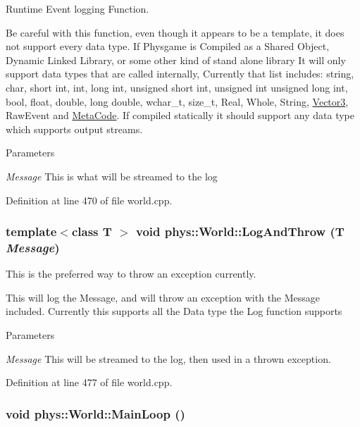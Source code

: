 Runtime Event logging Function. 

Be careful with this function, even though it appears to be a template, it does not support every data type. If Physgame is Compiled as a Shared Object, Dynamic Linked Library, or some other kind of stand alone library It will only support data types that are called internally, Currently that list includes: string, char, short int, int, long int, unsigned short int, unsigned int unsigned long int, bool, float, double, long double, wchar\_\-t, size\_\-t, Real, Whole, String, \hyperlink{classphys_1_1Vector3}{Vector3}, RawEvent and \hyperlink{classphys_1_1MetaCode}{MetaCode}. If compiled statically it should support any data type which supports output streams. 
\begin{DoxyParams}{Parameters}
\item[{\em Message}]This is what will be streamed to the log \end{DoxyParams}


Definition at line 470 of file world.cpp.

\hypertarget{classphys_1_1World_a88e6bdee6b972111b6804ca746738c50}{
\subsubsection[{LogAndThrow}]{\setlength{\rightskip}{0pt plus 5cm}template$<$class T $>$ void phys::World::LogAndThrow (T {\em Message})}}
\label{da/ddf/classphys_1_1World_a88e6bdee6b972111b6804ca746738c50}


This is the preferred way to throw an exception currently. 

This will log the Message, and will throw an exception with the Message included. Currently this supports all the Data type the Log function supports 
\begin{DoxyParams}{Parameters}
\item[{\em Message}]This will be streamed to the log, then used in a thrown exception. \end{DoxyParams}


Definition at line 477 of file world.cpp.

\hypertarget{classphys_1_1World_af1d9e36d43f5e50543fa2351a32c8362}{
\subsubsection[{MainLoop}]{\setlength{\rightskip}{0pt plus 5cm}void phys::World::MainLoop ()}}
\label{da/ddf/classphys_1_1World_af1d9e36d43f5e50543fa2351a32c8362}


